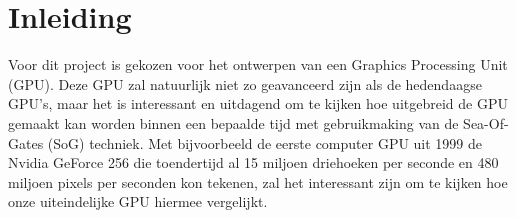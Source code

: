 \documentclass{scrreprt} %
\date{22 november 2013}
\begin{document}
\chapter{Inleiding}
Voor dit project is gekozen voor het ontwerpen van een Graphics Processing Unit (GPU).
Deze GPU zal natuurlijk niet zo geavanceerd zijn als de hedendaagse GPU's, maar het is interessant en uitdagend om te kijken hoe uitgebreid de GPU gemaakt kan worden binnen een bepaalde tijd met gebruikmaking van de Sea-Of-Gates (SoG) techniek.
Met bijvoorbeeld de eerste computer GPU uit 1999 de Nvidia GeForce 256 die toendertijd al 15 miljoen driehoeken per seconde en 480 miljoen pixels per seconden kon tekenen, zal het interessant zijn om te kijken hoe onze uiteindelijke GPU hiermee vergelijkt. \cite{geforce256}
\end{document}

